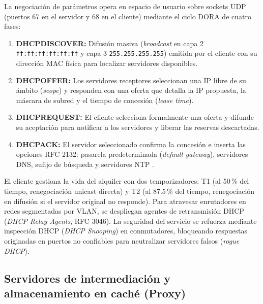 \documentclass[12pt]{article}
\begin{document}
La negociación de parámetros opera en espacio de usuario sobre sockets UDP (puertos 67 en el servidor y 68 en el cliente) mediante el ciclo DORA de cuatro fases:
\begin{enumerate}[noitemsep, topsep=1pt, parsep=0pt]
    \item \textbf{DHCPDISCOVER:} Difusión masiva (\textit{broadcast} en capa 2 \texttt{ff:ff:ff:ff:ff:ff} y capa 3 \texttt{255.255.255.255}) emitida por el cliente con su dirección MAC física para localizar servidores disponibles.
    \item \textbf{DHCPOFFER:} Los servidores receptores seleccionan una IP libre de su ámbito (\textit{scope}) y responden con una oferta que detalla la IP propuesta, la máscara de subred y el tiempo de concesión (\textit{lease time}).
    \item \textbf{DHCPREQUEST:} El cliente selecciona formalmente una oferta y difunde su aceptación para notificar a los servidores y liberar las reservas descartadas.
    \item \textbf{DHCPACK:} El servidor seleccionado confirma la concesión e inserta las opciones RFC 2132: pasarela predeterminada (\textit{default gateway}), servidores DNS, sufijo de búsqueda y servidores NTP \parencite[\S 3.1, pp.\ 13--16]{rfc2131}.
\end{enumerate}

El cliente gestiona la vida del alquiler con dos temporizadores: T1 (al 50\,\% del tiempo, renegociación unicast directa) y T2 (al 87.5\,\% del tiempo, renegociación en difusión si el servidor original no responde). Para atravesar enrutadores en redes segmentadas por VLAN, se despliegan agentes de retransmisión DHCP (\textit{DHCP Relay Agents}, RFC 3046). La seguridad del servicio se refuerza mediante inspección DHCP (\textit{DHCP Snooping}) en conmutadores, bloqueando respuestas originadas en puertos no confiables para neutralizar servidores falsos (\textit{rogue DHCP}).

\subsection{Servidores de intermediación y almacenamiento en caché (Proxy)}
\label{sec:servidoresProxy}
\end{document}
